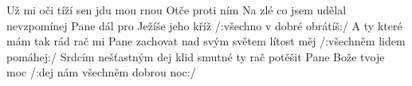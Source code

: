 \begin{TEXT}{Už mi oči tíží sen}
\SLOKA {}      jdu   \NL
{} mou rnou   \NL
Otče proti ním 
   
\SLOKA Na zlé co jsem udělal nevzpomínej Pane dál \NL
pro Ježíše jeho kříž \NL
/:všechno v dobré obrátíš:/ 
\SLOKA A ty které mám tak rád rač mi Pane zachovat \NL
nad svým světem lítost měj \NL
/:všechněm lidem pomáhej:/ 
\SLOKA Srdcím nešťastným dej klid smutné ty rač potěšit \NL
Pane Bože tvoje moc \NL
/:dej nám všechněm dobrou noc:/ \NL
\end{TEXT}
